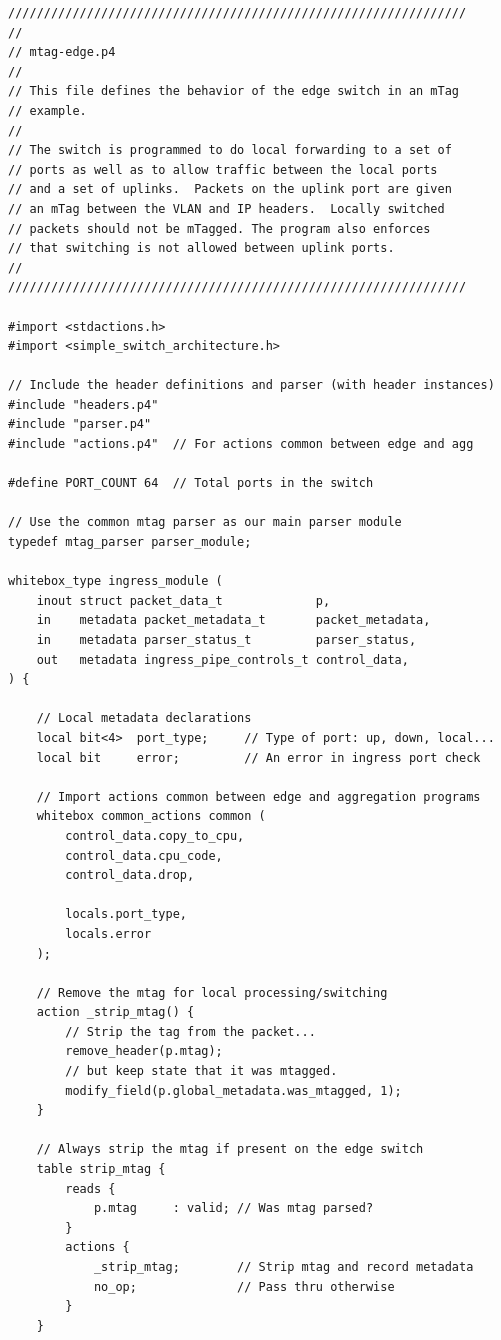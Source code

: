 \documentclass[12pt]{article}
\begin{document}
\begin{lstlisting}[style=P4style]
////////////////////////////////////////////////////////////////
//
// mtag-edge.p4
//
// This file defines the behavior of the edge switch in an mTag
// example.
//
// The switch is programmed to do local forwarding to a set of
// ports as well as to allow traffic between the local ports
// and a set of uplinks.  Packets on the uplink port are given
// an mTag between the VLAN and IP headers.  Locally switched
// packets should not be mTagged. The program also enforces
// that switching is not allowed between uplink ports.
//
////////////////////////////////////////////////////////////////

#import <stdactions.h>
#import <simple_switch_architecture.h>

// Include the header definitions and parser (with header instances)
#include "headers.p4"
#include "parser.p4"
#include "actions.p4"  // For actions common between edge and agg

#define PORT_COUNT 64  // Total ports in the switch

// Use the common mtag parser as our main parser module
typedef mtag_parser parser_module;

whitebox_type ingress_module (
    inout struct packet_data_t             p,
    in    metadata packet_metadata_t       packet_metadata,
    in    metadata parser_status_t         parser_status,
    out   metadata ingress_pipe_controls_t control_data,
) {

    // Local metadata declarations
    local bit<4>  port_type;     // Type of port: up, down, local...
    local bit     error;         // An error in ingress port check

    // Import actions common between edge and aggregation programs
    whitebox common_actions common (
        control_data.copy_to_cpu,
        control_data.cpu_code,
        control_data.drop,

        locals.port_type,
        locals.error
    );

    // Remove the mtag for local processing/switching
    action _strip_mtag() {
        // Strip the tag from the packet...
        remove_header(p.mtag);
        // but keep state that it was mtagged.
        modify_field(p.global_metadata.was_mtagged, 1);
    }

    // Always strip the mtag if present on the edge switch
    table strip_mtag {
        reads {
            p.mtag     : valid; // Was mtag parsed?
        }
        actions {
            _strip_mtag;        // Strip mtag and record metadata
            no_op;              // Pass thru otherwise
        }
    }


\end{lstlisting}
\end{document}
